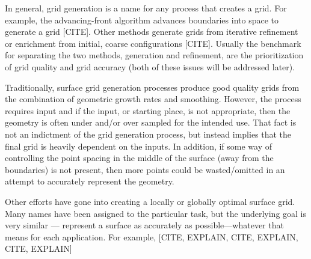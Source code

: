 In general, grid generation is a name for any process that creates a
grid. For example, the advancing-front algorithm advances boundaries
into space to generate a grid \cite{tristrano98, diaz-morcillo98}[CITE].
Other methods generate grids from iterative refinement or enrichment
from initial, coarse configurations \cite{marcum98, marcum00,
shewchuk02}[CITE]. Usually the benchmark for separating the two
methods, generation and refinement, are the prioritization of grid
quality and grid accuracy (both of these issues will be addressed
later).

Traditionally, surface grid generation processes produce good quality
grids from the combination of geometric growth rates and smoothing.
However, the process requires input and if the input, or starting place,
is not appropriate, then the geometry is often under and/or over sampled
for the intended use. That fact is not an indictment of the grid
generation process, but instead implies that the final grid is heavily
dependent on the inputs. In addition, if some way of controlling the
point spacing in the middle of the surface (away from the boundaries) is
not present, then more points could be wasted/omitted in an attempt to
accurately represent the geometry.

Other efforts have gone into creating a locally or globally optimal
surface grid. Many names have been assigned to the particular task, but
the underlying goal is very similar --- represent a surface as
accurately as possible---whatever that means for each application. For
example, [CITE, EXPLAIN, CITE, EXPLAIN, CITE, EXPLAIN]
